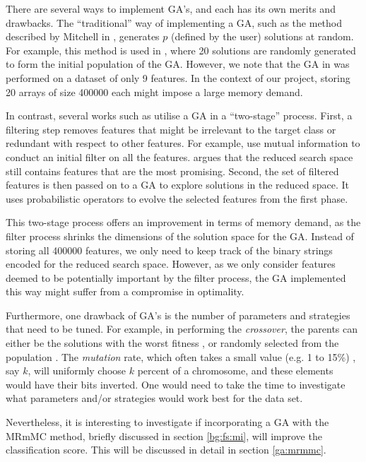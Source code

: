 \documentclass[12pt, twoside, a4paper]{report}
\begin{document}
There are several ways to implement GA's, and each has its own merits and drawbacks. The ``traditional'' way of implementing a GA, such as the method described by Mitchell in \cite{RefWorks:205}, generates $p$ (defined by the user) solutions at random. For example, this method is used in \cite{RefWorks:206}, where 20 solutions are randomly generated to form the initial population of the GA. However, we note that the GA in \cite{RefWorks:206} was performed on a dataset of only 9 features. In the context of our project, storing 20 arrays of size 400000 each might impose a large memory demand.

In contrast, several works such as \cite{RefWorks:197, RefWorks:198, RefWorks:199, RefWorks:200, RefWorks:203} utilise a GA in a ``two-stage'' process. First, a filtering step removes features that might be irrelevant to the target class or redundant with respect to other features. For example, \cite{RefWorks:197, RefWorks:198, RefWorks:203} use mutual information to conduct an initial filter on all the features. \cite{RefWorks:201} argues that the reduced search space still contains features that are the most promising. Second, the set of filtered features is then passed on to a GA to explore solutions in the reduced space. It uses probabilistic operators to evolve the selected features from the first phase.

This two-stage process offers an improvement in terms of memory demand, as the filter process shrinks the dimensions of the solution space for the GA. Instead of storing all 400000 features, we only need to keep track of the binary strings encoded for the reduced search space. However, as we only consider features deemed to be potentially important by the filter process, the GA implemented this way might suffer from a compromise in optimality.

Furthermore, one drawback of GA's is the number of parameters and strategies that need to be tuned. For example, in performing the \textit{crossover}, the parents can either be  the solutions with the worst fitness \cite{RefWorks:203}, or randomly selected from the population \cite{RefWorks:205}. The \textit{mutation} rate, which often takes a small value (e.g. 1 to 15\%) \cite{RefWorks:206}, say $k$, will uniformly choose $k$ percent of a chromosome, and these elements would have their bits inverted. One would need to take the time to investigate what parameters and/or strategies would work best for the data set.

Nevertheless, it is interesting to investigate if incorporating a GA with the MRmMC method, briefly discussed in section \ref{bg:fs:mi}, will improve the classification score. This will be discussed in detail in section \ref{ga:mrmmc}.
\end{document}
